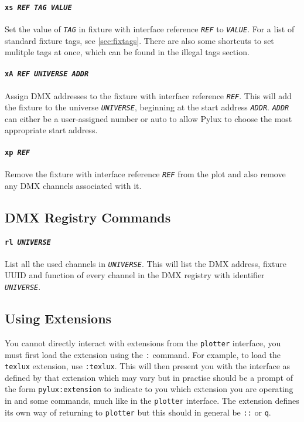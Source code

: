 \documentclass[a4paper]{article}
\begin{document}
\paragraph{\texttt{xs \textit{REF TAG VALUE}}}
Set the value of \texttt{\textit{TAG}} in fixture with interface reference 
\texttt{\textit{REF}} to \texttt{\textit{VALUE}}. For a list of standard 
fixture tags, see \autoref{sec:fixtags}. There are also some shortcuts to set 
mulitple tags at once, which can be found in the illegal tags section.

\paragraph{\texttt{xA \textit{REF UNIVERSE ADDR}}}
Assign DMX addresses to the fixture with interface reference 
\texttt{\textit{REF}}. This will add the fixture to the universe 
\texttt{\textit{UNIVERSE}}, beginning at the start address 
\texttt{\textit{ADDR}}. \texttt{\textit{ADDR}} can either be a user-assigned 
number or auto to allow Pylux to choose the most appropriate start address.

\paragraph{\texttt{xp \textit{REF}}}
Remove the fixture with interface reference \texttt{\textit{REF}} from the 
plot and also remove any DMX channels associated with it.

\subsection{DMX Registry Commands}

\paragraph{\texttt{rl \textit{UNIVERSE}}}
List all the used channels in \texttt{\textit{UNIVERSE}}. This will list the 
DMX address, fixture UUID and function of every channel in the DMX registry 
with identifier \texttt{\textit{UNIVERSE}}.

\subsection{Using Extensions}
You cannot directly interact with extensions from the \texttt{plotter} 
interface, you must first load the extension using the \texttt{:} command.
For example, to load the \texttt{texlux} extension, use \texttt{:texlux}. 
This will then present you with the interface as defined by that extension 
which may vary but in practise should be a prompt of the form 
\texttt{pylux:extension} to indicate to you which extension you are 
operating in and some commands, much like in the \texttt{plotter} interface.
The extension defines its own way of returning to \texttt{plotter} but this 
should in general be \texttt{::} or \texttt{q}.
\end{document}
